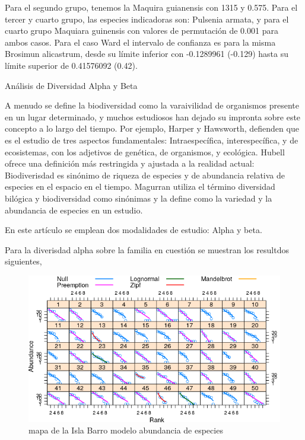 \documentclass[11pt,]{article}
\begin{document}
Para el segundo grupo, tenemos la Maquira guianensis con 1315 y 0.575.
Para el tercer y cuarto grupo, las especies indicadoras son: Pulsenia
armata, y para el cuarto grupo Maquiara guinensis con valores de
permutación de 0.001 para ambos casos. Para el caso Ward el intervalo de
confianza es para la misma Brosimun alicastrum, desde su límite inferior
con -0.1289961 (-0.129) hasta su límite superior de 0.41576092 (0.42).

Análisis de Diversidad Alpha y Beta

A menudo se define la biodiversidad como la varaivilidad de organismos
presente en un lugar determinado, y muchos estudiosos han dejado su
impronta sobre este concepto a lo largo del tiempo. Por ejemplo, Harper
y Hawsworth, defienden que es el estudio de tres aspectos fundamentales:
Intraespecífica, interespecífica, y de ecosistemas, con los adjetivos de
genética, de organismos, y ecológica. Hubell ofrece una definición más
restringida y ajustada a la realidad actual: Biodiverisdad es sinónimo
de riqueza de especies y de abundancia relativa de especies en el
espacio en el tiempo. Magurran utiliza el término diversidad bilógica y
biodiversidad como sinónimas y la define como la variedad y la
abundancia de especies en un estudio.

En este artículo se emplean dos modalidades de estudio: Alpha y beta.

Para la diverisdad alpha sobre la familia en cuestión se muestran los
resultdos siguientes,

\begin{figure}
\centering
\includegraphics[width=1.00000\textwidth]{modelo_abundancia_especie.png}
\caption{mapa de la Isla Barro modelo abundancia de especies
\label{fig:bci_map}}
\end{figure}
\end{document}
